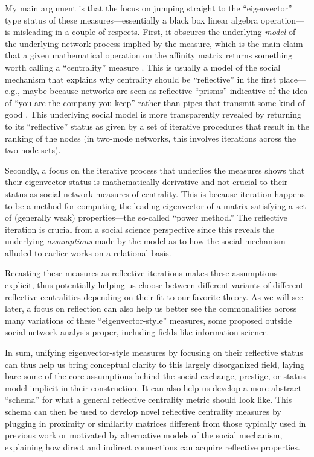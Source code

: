 \documentclass[a4paper,fleqn]{cas-sc}
\begin{document}
My main argument is that the focus on jumping straight to the ``eigenvector'' type status of these measures---essentially a black box linear algebra operation---is misleading in a couple of respects. First, it obscures the underlying \textit{model} of the underlying network process implied by the measure, which is the main claim that a given mathematical operation on the affinity matrix returns something worth calling a ``centrality'' measure \citep{borgatti05}. This is usually a model of the social mechanism that explains why centrality should be ``reflective'' in the first place---e.g., maybe because networks are seen as reflective ``prisms'' indicative of the idea of ``you are the company you keep'' rather than pipes that transmit some kind of good \citep{podolny96}. This underlying social model is more transparently revealed by returning to its ``reflective'' status as given by a set of iterative procedures that result in the ranking of the nodes (in two-mode networks, this involves iterations across the two node sets). 

Secondly, a focus on the iterative process that underlies the measures shows that their eigenvector status is mathematically derivative and not crucial to their status as social network measures of centrality. This is because iteration happens to be a method for computing the leading eigenvector of a matrix satisfying a set of (generally weak) properties---the so-called ``power method.'' The reflective iteration is crucial from a social science perspective since this reveals the underlying \textit{assumptions} made by the model as to how the social mechanism alluded to earlier works on a relational basis. 

Recasting these measures as reflective iterations makes these assumptions explicit, thus potentially helping us choose between different variants of different reflective centralities depending on their fit to our favorite theory. As we will see later, a focus on reflection can also help us better see the commonalities across many variations of these ``eigenvector-style'' measures, some proposed outside social network analysis proper, including fields like information science. 

In sum, unifying eigenvector-style measures by focusing on their reflective status can thus help us bring conceptual clarity to this largely disorganized field, laying bare some of the core assumptions behind the social exchange, prestige, or status model implicit in their construction. It can also help us develop a more abstract ``schema'' for what a general reflective centrality metric should look like. This schema can then be used to develop novel reflective centrality measures by plugging in proximity or similarity matrices different from those typically used in previous work or motivated by alternative models of the social mechanism, explaining how direct and indirect connections can acquire reflective properties.  
\end{document}
